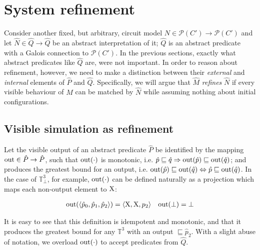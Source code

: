 \section{System refinement}

Consider another fixed, but arbitrary, circuit model $N \in \mathcal{P}(C') \rightarrow \mathcal{P}(C')$ and let $\hat N \in \hat Q \rightarrow \hat Q$ be an abstract interpretation of it; $\hat Q$ is an abstract predicate with a Galois connection to $\mathcal{P}(C')$. In the previous sections, exactly what abstract predicates like $\hat Q$ are, were not important. In order to reason about refinement, however, we need to make a distinction between their \textit{external} and \textit{internal} elements of $\hat P$ and $\hat Q$. Specifically, we will argue that $\hat M$ \textit{refines} $\hat N$ if every visible behaviour of $\hat M$ can be matched by $\hat N$ while assuming nothing about initial configurations.

\subsection{Visible simulation as refinement}

Let the visible output of an abstract predicate $\hat P$ be identified by the mapping $\operatorname{out} \in \hat P \rightarrow \hat P$, such that $\operatorname{out}(\cdot)$ is monotonic, i.e. $\hat p \sqsubseteq \hat q \Rightarrow \operatorname{out}(\hat p) \sqsubseteq \operatorname{out}(\hat q)$; and produces the greatest bound for an output, i.e. $\operatorname{out}(\hat p) \sqsubseteq \operatorname{out}(\hat q) \Leftrightarrow \hat p \sqsubseteq \operatorname{out}(\hat q)$. In the case of $\mathbb{T}_{\bot}^{3}$, for example, $\operatorname{out}(\cdot)$ can be defined naturally as a projection which maps each non-output element to $\mathrm{X}$:



\begin{align*}
\operatorname{out}(\langle \hat p_{0}, \hat p_{1}, \hat p_{2} \rangle) = \langle \mathrm{X}, \mathrm{X}, p_{2} \rangle && \operatorname{out}(\bot) = \bot
\end{align*}

\noindent It is easy to see that this definition is idempotent and monotonic, and that it produces the greatest bound for any $\mathbb{T}^{3}$ with an output $\sqsubseteq \hat p_{2}$. With a slight abuse of notation, we overload $\operatorname{out}(\cdot)$ to accept predicates from $\hat Q$.


